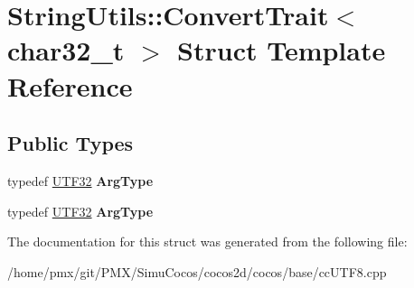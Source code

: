 \hypertarget{structStringUtils_1_1ConvertTrait_3_01char32__t_01_4}{}\section{String\+Utils\+:\+:Convert\+Trait$<$ char32\+\_\+t $>$ Struct Template Reference}
\label{structStringUtils_1_1ConvertTrait_3_01char32__t_01_4}
\subsection*{Public Types}
\begin{DoxyCompactItemize}
\item 
\mbox{\label{structStringUtils_1_1ConvertTrait_3_01char32__t_01_4_ae2b90d60bdcebfa12148c56475e29bbe}} 
typedef \hyperlink{structUTF32}{U\+T\+F32} {\bfseries Arg\+Type}
\item 
\mbox{\label{structStringUtils_1_1ConvertTrait_3_01char32__t_01_4_ae2b90d60bdcebfa12148c56475e29bbe}} 
typedef \hyperlink{structUTF32}{U\+T\+F32} {\bfseries Arg\+Type}
\end{DoxyCompactItemize}


The documentation for this struct was generated from the following file\+:\begin{DoxyCompactItemize}
\item 
/home/pmx/git/\+P\+M\+X/\+Simu\+Cocos/cocos2d/cocos/base/cc\+U\+T\+F8.\+cpp\end{DoxyCompactItemize}
